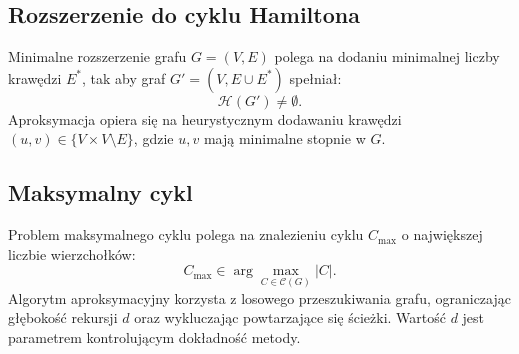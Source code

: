\subsection{Rozszerzenie do cyklu Hamiltona}

Minimalne rozszerzenie grafu \( G = (V, E) \) polega na dodaniu minimalnej liczby krawędzi \( E^* \), tak aby graf \( G' = (V, E \cup E^*) \) spełniał:
\[
\mathcal{H}(G') \neq \emptyset.
\]
Aproksymacja opiera się na heurystycznym dodawaniu krawędzi \( (u, v) \in \{ V \times V \setminus E \} \), gdzie \( u, v \) mają minimalne stopnie w \( G \).

\subsection{Maksymalny cykl}

Problem maksymalnego cyklu polega na znalezieniu cyklu \( C_{\text{max}} \) o największej liczbie wierzchołków:
\[
C_{\text{max}} \in \arg\max_{C \in \mathcal{C}(G)} |C|.
\]
Algorytm aproksymacyjny korzysta z losowego przeszukiwania grafu, ograniczając głębokość rekursji \( d \) oraz wykluczając powtarzające się ścieżki. Wartość \( d \) jest parametrem kontrolującym dokładność metody.


\vspace{1em}

